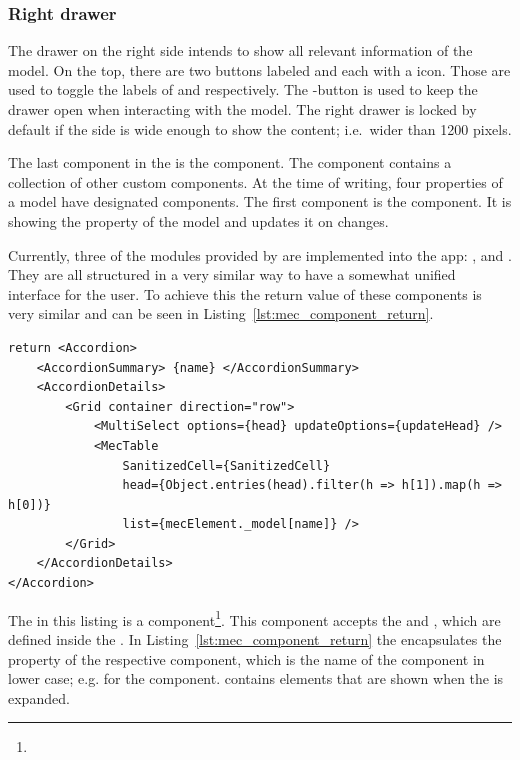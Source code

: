 \subsubsection{Right drawer}

The drawer on the right side intends to show all relevant information of the  model.
On the top, there are two buttons labeled  and  each with a  icon.
Those are used to toggle the labels of  and  respectively.
The -button is used to keep the drawer open when interacting with the model.
The right drawer is locked by default if the side is wide enough to show the content; i.e.\ wider than 1200 pixels.

The last component in the  is the  component.
The  component contains a collection of other custom components.
At the time of writing, four properties of a  model have designated components.
The first component is the  component.
It is showing the  property of the  model and updates it on changes.

Currently, three of the modules provided by  are implemented into the app:
,  and .
They are all structured in a very similar way to have a somewhat unified interface for the user.
To achieve this the return value of these components is very similar and can be seen in Listing~\ref{lst:mec_component_return}.

\begin{lstlisting}[label={lst:mec_component_return}, caption={Return value of a custom \name{mec2} component.}]
return <Accordion>
    <AccordionSummary> {name} </AccordionSummary>
    <AccordionDetails>
        <Grid container direction="row">
            <MultiSelect options={head} updateOptions={updateHead} />
            <MecTable
                SanitizedCell={SanitizedCell}
                head={Object.entries(head).filter(h => h[1]).map(h => h[0])}
                list={mecElement._model[name]} />
        </Grid>
    </AccordionDetails>
</Accordion>
\end{lstlisting}

The  in this listing is a  component\footnote{}.
This component accepts the  and , which are defined inside the .
In Listing~\ref{lst:mec_component_return} the  encapsulates the  property of the respective component, which is the name of the component in lower case; e.g.  for the  component.
 contains elements that are shown when the  is expanded.


